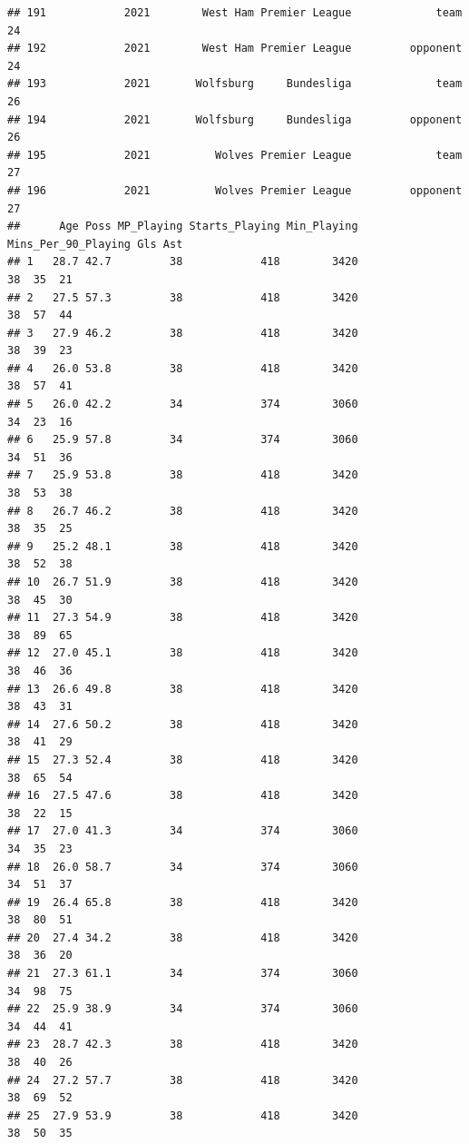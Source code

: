 \documentclass[
]{book}
\theoremstyle{definition}
\theoremstyle{definition}
\theoremstyle{definition}
\theoremstyle{definition}
\theoremstyle{remark}
\begin{document}
\begin{verbatim}
## 191            2021        West Ham Premier League             team          24
## 192            2021        West Ham Premier League         opponent          24
## 193            2021       Wolfsburg     Bundesliga             team          26
## 194            2021       Wolfsburg     Bundesliga         opponent          26
## 195            2021          Wolves Premier League             team          27
## 196            2021          Wolves Premier League         opponent          27
##      Age Poss MP_Playing Starts_Playing Min_Playing Mins_Per_90_Playing Gls Ast
## 1   28.7 42.7         38            418        3420                  38  35  21
## 2   27.5 57.3         38            418        3420                  38  57  44
## 3   27.9 46.2         38            418        3420                  38  39  23
## 4   26.0 53.8         38            418        3420                  38  57  41
## 5   26.0 42.2         34            374        3060                  34  23  16
## 6   25.9 57.8         34            374        3060                  34  51  36
## 7   25.9 53.8         38            418        3420                  38  53  38
## 8   26.7 46.2         38            418        3420                  38  35  25
## 9   25.2 48.1         38            418        3420                  38  52  38
## 10  26.7 51.9         38            418        3420                  38  45  30
## 11  27.3 54.9         38            418        3420                  38  89  65
## 12  27.0 45.1         38            418        3420                  38  46  36
## 13  26.6 49.8         38            418        3420                  38  43  31
## 14  27.6 50.2         38            418        3420                  38  41  29
## 15  27.3 52.4         38            418        3420                  38  65  54
## 16  27.5 47.6         38            418        3420                  38  22  15
## 17  27.0 41.3         34            374        3060                  34  35  23
## 18  26.0 58.7         34            374        3060                  34  51  37
## 19  26.4 65.8         38            418        3420                  38  80  51
## 20  27.4 34.2         38            418        3420                  38  36  20
## 21  27.3 61.1         34            374        3060                  34  98  75
## 22  25.9 38.9         34            374        3060                  34  44  41
## 23  28.7 42.3         38            418        3420                  38  40  26
## 24  27.2 57.7         38            418        3420                  38  69  52
## 25  27.9 53.9         38            418        3420                  38  50  35

\end{verbatim}
\end{document}
